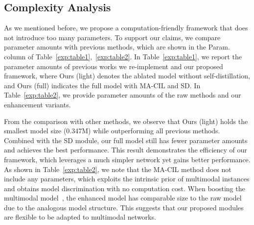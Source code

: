 \documentclass[sigconf]{acmart}
\begin{document}
\subsection{Complexity Analysis}

As we mentioned before, we propose a computation-friendly framework that does not introduce too many parameters. To support our claims, we compare parameter amounts with previous methods, which are shown in the Param. column of Table~\ref{exp:table1},~\ref{exp:table2}. In Table~\ref{exp:table1}, we report the parameter amounts of previous works we re-implement and our proposed framework, where Ours (light) denotes the ablated model without self-distillation, and Ours (full) indicates the full model with MA-CIL and SD. In Table~\ref{exp:table2}, we provide parameter amounts of the raw methods and our enhancement variants.

From the comparison with other methods, we observe that Ours (light) holds the smallest model size (0.347M) while outperforming all previous methods. Combined with the SD module, our full model still has fewer parameter amounts and achieves the best performance. This result demonstrates the efficiency of our framework, which leverages a much simpler network yet gains better performance. As shown in Table~\ref{exp:table2}, we note that the MA-CIL method does not include any parameters, which exploits the intrinsic prior of multimodal instances and obtains model discrimination with no computation cost. When boosting the multimodal model~\cite{pang2021violence}, the enhanced model has comparable size to the raw model due to the analogous model structure. This suggests that our proposed modules are flexible to be adapted to multimodal networks.
\end{document}
